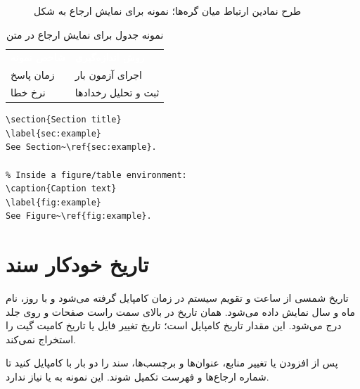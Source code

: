 \begin{figure}[htbp]
\centering
\DSCNetwork
\caption{طرح نمادین ارتباط میان گره‌ها؛ نمونه برای نمایش ارجاع به شکل}
\label{fig:network-example}
\end{figure}

\begin{table}[htbp]
\centering
\begin{tabularx}{\linewidth}{@{}>{\raggedleft\arraybackslash}X>{\raggedleft\arraybackslash}X@{}}
\rowcolor{DSCNavy}\textcolor{white}{\bfseries شاخص نمونه} & \textcolor{white}{\bfseries روش اندازه‌گیری}\\
\rowcolor{DSCPale}زمان پاسخ & اجرای آزمون بار\\
نرخ خطا & ثبت و تحلیل رخدادها\\
\end{tabularx}
\caption{نمونه جدول برای نمایش ارجاع در متن}
\label{tab:reference-example}
\end{table}
\begin{latin}
\begin{lstlisting}[style=DSCCode]
\section{Section title}
\label{sec:example}
See Section~\ref{sec:example}.

% Inside a figure/table environment:
\caption{Caption text}
\label{fig:example}
See Figure~\ref{fig:example}.
\end{lstlisting}
\end{latin}

\section{تاریخ خودکار سند}
تاریخ شمسی از ساعت و تقویم سیستم در زمان کامپایل گرفته می‌شود و با روز، نام ماه و سال نمایش داده می‌شود. همان تاریخ در بالای سمت راست صفحات و روی جلد درج می‌شود. این مقدار تاریخ کامپایل است؛ تاریخ تغییر فایل یا تاریخ کامیت گیت را استخراج نمی‌کند.

پس از افزودن یا تغییر منابع، عنوان‌ها و برچسب‌ها، سند را دو بار با  کامپایل کنید تا شماره ارجاع‌ها و فهرست تکمیل شوند. این نمونه به  یا  نیاز ندارد.

